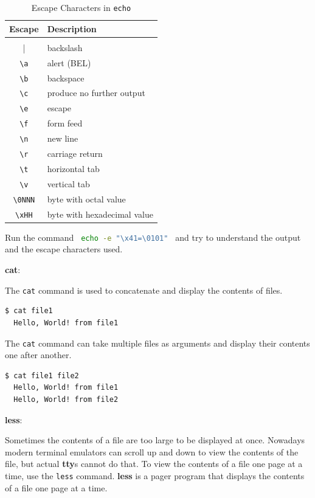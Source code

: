 \begin{table}[h!]
\caption{Escape Characters in \lstinline|echo|}
\begin{tabular}{ c l }
  \toprule
 Escape & Description \\
 \midrule
  \lstinline|\\| & backslash \\
  \lstinline|\a| & alert (BEL) \\
  \lstinline|\b| & backspace \\
  \lstinline|\c| & produce no further output \\
  \lstinline|\e| & escape \\
  \lstinline|\f| & form feed \\
  \lstinline|\n| & new line \\
  \lstinline|\r| & carriage return \\
  \lstinline|\t| & horizontal tab \\
  \lstinline|\v| & vertical tab \\
  \lstinline|\0NNN| & byte with octal value \\
  \lstinline|\xHH| & byte with hexadecimal value \\
  \bottomrule
\end{tabular}
\end{table}

\begin{exercise}
  Run the command
  \lstinline[language=bash]{ echo -e "\x41=\0101" } and try to understand the output and the escape characters used.
\end{exercise}

\textbf{cat}:

The \lstinline|cat| command is used to concatenate and display the contents of files.

\begin{lstlisting}[language=bash]
  $ cat file1
  Hello, World! from file1
\end{lstlisting}

The \lstinline|cat| command can take multiple files as arguments and display their contents one after another.

\begin{lstlisting}[language=bash]
  $ cat file1 file2
  Hello, World! from file1
  Hello, World! from file2
\end{lstlisting}

\textbf{less}:

Sometimes the contents of a file are too large to be displayed at once.
Nowadays modern terminal emulators can scroll up and down to view the contents of the file,
but actual \textbf{tty}s cannot do that.
To view the contents of a file one page at a time, use the \lstinline|less| command.
\textbf{less} is a pager program that displays the contents of a file one page at a time.

